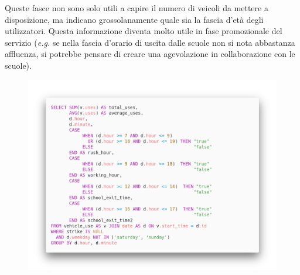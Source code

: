 Queste fasce non sono solo utili a capire il numero di veicoli da mettere a disposizione, ma indicano grossolanamente quale sia 
la fascia d'età degli utilizzatori. Questa informazione diventa molto utile in fase promozionale del servizio (\emph{e.g.} se nella fascia d'orario
di uscita dalle scuole non si nota abbastanza affluenza, si potrebbe pensare di creare una agevolazione in collaborazione con le scuole).

\begin{figure}[H]                                                                                                                                                            
\centering                                                                                                                                                                   
\includegraphics[width=\textwidth]{images/query6}                                                                                                                                   
\label{fig:query6}                                                                                                                                                           
\end{figure}

